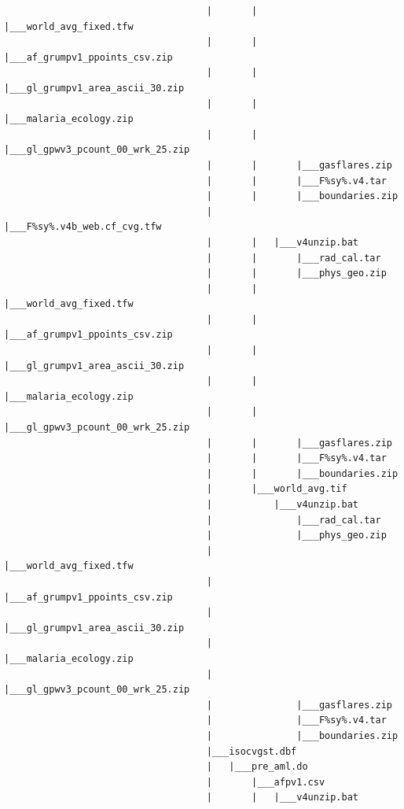 \documentclass[]{book}
\begin{document}
\begin{verbatim}
                                    |       |       |___world_avg_fixed.tfw
                                    |       |       |___af_grumpv1_ppoints_csv.zip
                                    |       |       |___gl_grumpv1_area_ascii_30.zip
                                    |       |       |___malaria_ecology.zip
                                    |       |       |___gl_gpwv3_pcount_00_wrk_25.zip
                                    |       |       |___gasflares.zip
                                    |       |       |___F%sy%.v4.tar
                                    |       |       |___boundaries.zip
                                    |       |___F%sy%.v4b_web.cf_cvg.tfw
                                    |       |   |___v4unzip.bat
                                    |       |       |___rad_cal.tar
                                    |       |       |___phys_geo.zip
                                    |       |       |___world_avg_fixed.tfw
                                    |       |       |___af_grumpv1_ppoints_csv.zip
                                    |       |       |___gl_grumpv1_area_ascii_30.zip
                                    |       |       |___malaria_ecology.zip
                                    |       |       |___gl_gpwv3_pcount_00_wrk_25.zip
                                    |       |       |___gasflares.zip
                                    |       |       |___F%sy%.v4.tar
                                    |       |       |___boundaries.zip
                                    |       |___world_avg.tif
                                    |           |___v4unzip.bat
                                    |               |___rad_cal.tar
                                    |               |___phys_geo.zip
                                    |               |___world_avg_fixed.tfw
                                    |               |___af_grumpv1_ppoints_csv.zip
                                    |               |___gl_grumpv1_area_ascii_30.zip
                                    |               |___malaria_ecology.zip
                                    |               |___gl_gpwv3_pcount_00_wrk_25.zip
                                    |               |___gasflares.zip
                                    |               |___F%sy%.v4.tar
                                    |               |___boundaries.zip
                                    |___isocvgst.dbf
                                    |   |___pre_aml.do
                                    |       |___afpv1.csv
                                    |       |   |___v4unzip.bat

\end{verbatim}
\end{document}
